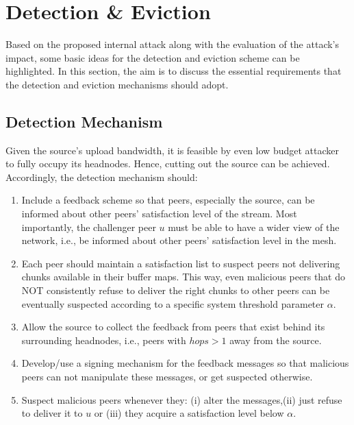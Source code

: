 \section{Detection \& Eviction}
\label{sec:detection}

Based on the proposed internal attack along with the evaluation of the attack's impact, some basic ideas for the detection and eviction scheme can be highlighted.
In this section, the aim is to discuss the essential requirements that the detection and eviction mechanisms should adopt.

\subsection{Detection Mechanism}
Given the source's upload bandwidth, it is feasible by even low budget attacker to fully occupy its headnodes. 
Hence, cutting out the source can be achieved.
Accordingly, the detection mechanism should:
\begin{enumerate}
 \item Include a feedback scheme so that peers, especially the source, can be informed about other peers' satisfaction level of the stream. 
 Most importantly, the challenger peer $u$ must be able to have a wider view of the network, i.e., be informed about other peers' satisfaction level in the mesh.
 
 \item Each peer should maintain a satisfaction list to suspect peers not delivering chunks available in their buffer maps. 
 This way, even malicious peers that do NOT consistently refuse to deliver the right chunks to other peers can be eventually suspected according to a specific system threshold parameter $\alpha$.
 
 \item Allow the source to collect the feedback from peers that exist behind its surrounding headnodes, i.e., peers with $hops>1$ away from the source.
 
 \item Develop/use a signing mechanism for the feedback messages so that malicious peers can not manipulate these messages, or get suspected otherwise.
 
 \item Suspect malicious peers whenever they: (i) alter the messages,(ii) just refuse to deliver it to $u$ or (iii) they acquire a satisfaction level below $\alpha$.
  
 
\end{enumerate}

